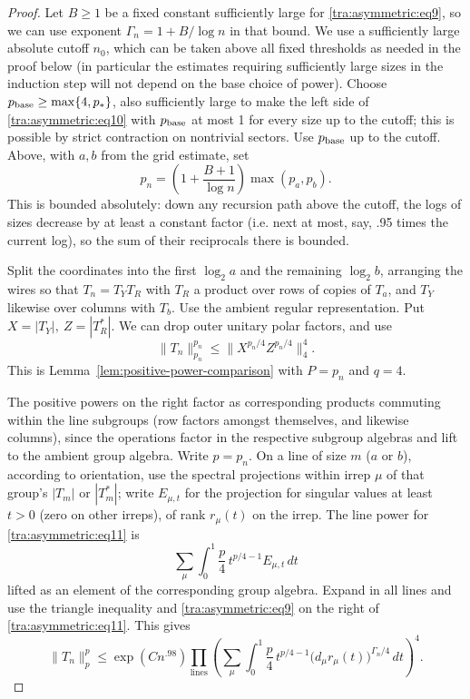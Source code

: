 \begin{proof}\label{tra:asymmetric:trace-proof}
\label{tra:asymmetric:spectral-integral-recursion}
Let \(B\ge 1\) be a fixed constant sufficiently large for \eqref{tra:asymmetric:eq9}, so we can use exponent \(\Gamma_n=1+B/\log n\) in that bound. We use a sufficiently large absolute cutoff \(n_0\), which can be taken above all fixed thresholds as needed in the proof below (in particular the estimates requiring sufficiently large sizes in the induction step will not depend on the base choice of power). Choose \(p_{\rm base}\ge \max\{4,p_*\}\), also sufficiently large to make the left side of \eqref{tra:asymmetric:eq10} with \(p_{\rm base}\) at most 1 for every size up to the cutoff; this is possible by strict contraction on nontrivial sectors. Use \(p_{\rm base}\) up to the cutoff. Above, with \(a,b\) from the grid estimate, set
\[
                  p_n=\left(1+\frac{B+1}{\log n}\right)\max(p_a,p_b).
\]
This is bounded absolutely: down any recursion path above the cutoff, the logs of sizes decrease by at least a constant factor (i.e. next at most, say, .95 times the current log), so the sum of their reciprocals there is bounded.

Split the coordinates into the first \(\log_2 a\) and the remaining \(\log_2 b\), arranging the wires so that \(T_n=T_Y T_R\) with \(T_R\) a product over rows of copies of \(T_a\), and \(T_Y\) likewise over columns with \(T_b\). Use the ambient regular representation. Put \(X=|T_Y|,\ Z=|T_R^*|\). We can drop outer unitary polar factors, and use
\begin{equation}
               \|T_n\|_{p_n}^{p_n}
                     \le \big\|X^{p_n/4} Z^{p_n/4}\big\|_4^4 .
                           \label{tra:asymmetric:eq11}
\end{equation}
This is Lemma~\ref{lem:positive-power-comparison} with $P=p_n$ and $q=4$.

The positive powers on the right factor as corresponding products commuting within the line subgroups (row factors amongst themselves, and likewise columns), since the operations factor in the respective subgroup algebras and lift to the ambient group algebra. Write \(p=p_n\). On a line of size \(m\) (\(a\) or \(b\)), according to orientation, use the spectral projections within irrep \(\mu\) of that group's \(|T_m|\) or \(|T_m^*|\); write \(E_{\mu,t}\) for the projection for singular values at least \(t>0\) (zero on other irreps), of rank \(r_\mu(t)\) on the irrep. The line power for \eqref{tra:asymmetric:eq11} is
\[
            \sum_\mu \int_0^1 \frac{p}{4}\,t^{p/4-1} E_{\mu,t}\,dt
\]
lifted as an element of the corresponding group algebra. Expand in all lines and use the triangle inequality and \eqref{tra:asymmetric:eq9} on the right of \eqref{tra:asymmetric:eq11}. This gives
\begin{equation}
 \|T_n\|_{p}^{p}
   \le \exp(C n^{.98})
        \prod_{\text{lines}}
        \left(\sum_\mu \int_0^1
             \frac{p}{4}\,t^{p/4-1}
             \big(d_\mu r_\mu(t)\big)^{\Gamma_n/4}\,dt\right)^4 .
                  \label{tra:asymmetric:eq12}
\end{equation}


\end{proof}
